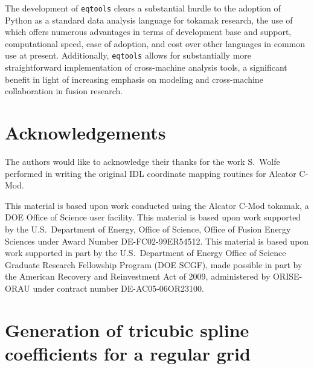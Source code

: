 \documentclass{elsarticle}
\newcommand{\eqtools}{\texttt{eqtools}\xspace}
\begin{document}
The development of \eqtools clears a substantial hurdle to the adoption of Python as a standard data analysis language for tokamak research, the use of which offers numerous advantages in terms of development base and support, computational speed, ease of adoption, and cost over other languages in common use at present.
Additionally, \eqtools allows for substantially more straightforward implementation of cross-machine analysis tools, a significant benefit in light of increasing emphasis on modeling and cross-machine collaboration in fusion research.


\section*{Acknowledgements}
The authors would like to acknowledge their thanks for the work S.~Wolfe performed in writing the original IDL coordinate mapping routines for Alcator C-Mod.

This material is based upon work conducted using the Alcator C-Mod tokamak, a DOE Office of Science user facility.
This material is based upon work supported by the U.S.\ Department of Energy, Office of Science, Office of Fusion Energy Sciences under Award Number DE-FC02-99ER54512.
This material is based upon work supported in part by the U.S.\ Department of Energy Office of Science Graduate Research Fellowship Program (DOE SCGF), made possible in part by the American Recovery and Reinvestment Act of 2009, administered by ORISE-ORAU under contract number DE-AC05-06OR23100.

\appendix
\section{Generation of tricubic spline coefficients for a regular grid}\label{sec:App}
\end{document}
